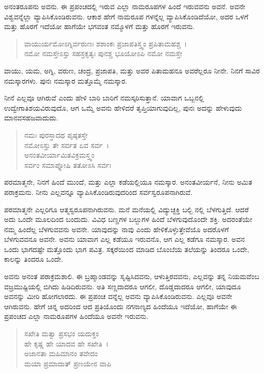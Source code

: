 ಅನಂತರೂಪನು ಅವನು. ಈ ಪ್ರಪಂಚದಲ್ಲಿ ಇರುವ ಎಲ್ಲಾ ನಾಮರೂಪಗಳ ಹಿಂದೆ ಇರುವವನು ಅವನೆ. ಅವನೇ ವಿಶ್ವವನ್ನೆಲ್ಲಾ ವ್ಯಾಪಿಸಿಕೊಂಡಿರುವನು. ಆಕಾಶ ಹೇಗೆ ನಾಮರೂಪ ಗಳನ್ನೆಲ್ಲ ವ್ಯಾಪಿಸಿಕೊಂಡಿದೆಯೋ, ಅದರ ಒಳಗೆ ಮತ್ತು ಹೊರಗೆ ಇದೆಯೋ ಹಾಗೆಯೇ ಭಗವಂತ ನಮ್ಮೊಳಗೆ ಮತ್ತು ಹೊರಗೆ ಇರುವನು.

\begin{verse}
ವಾಯುರ್ಯಮೋಽಗ್ನಿರ್ವರುಣಃ ಶಶಾಂಕಃ ಪ್ರಜಾಪತಿಸ್ತ್ವಂ ಪ್ರಪಿತಾಮಹಶ್ಚ~।\\ನಮೋ ನಮಸ್ತೇಽಸ್ತು ಸಹಸ್ರಕೃತ್ವಃ ಪುನಶ್ಚ ಭೂಯೋಽಪಿ ನಮೋ ನಮಸ್ತೇ 
\end{verse}

{\small ವಾಯು, ಯಮ, ಅಗ್ನಿ, ವರುಣ, ಚಂದ್ರ, ಪ್ರಜಾಪತಿ, ಮತ್ತು ಅವರ ಪಿತಾಮಹನೂ ಅವರೆಲ್ಲರೂ ನೀನೇ. ನಿನಗೆ ಸಾವಿರ ನಮಸ್ಕಾರಗಳು. ಪುನಃ ನಮಸ್ಕಾರ ಮತ್ತೊಮ್ಮೆ ನಮಸ್ಕಾರ.}

ನೀನೆ ಎಲ್ಲವೂ ಆಗಿರುವೆ ಎಂದು ಹೇಳಿ ಬಾರಿ ಬಾರಿಗೆ ನಮಸ್ಕರಿಸುತ್ತಾನೆ. ಯಾವಾಗ ಒಬ್ಬನಲ್ಲಿ ಉದ್ವೇಗಾತಿಶಯವಿರುವುದೊ, ಆಗ ಒಮ್ಮೆ ಅವನು ಹೇಳಿದರೆ ತೃಪ್ತಿಯಾಗುವುದಿಲ್ಲ, ಪುನಃ ಅದನ್ನು ಹೇಳುವುದು ಮಾನವಸಹಜವಾದುದು.

\begin{verse}
ನಮಃ ಪುರಸ್ತಾದಥ ಪೃಷ್ಠತಸ್ತೇ \\ ನಮೋಽಸ್ತು ತೇ ಸರ್ವತ ಏವ ಸರ್ವ~।\\ ಅನಂತವೀರ್ಯಾಮಿತವಿಕ್ರಮಸ್ತ್ವಂ \\ ಸರ್ವಂ ಸಮಾಪ್ನೋಷಿ ತತೋಽಸಿ ಸರ್ವಃ 
\end{verse}

{\small ಪರಮಾತ್ಮನೇ, ನಿನಗೆ ಹಿಂದೆ ಮುಂದೆ, ಮತ್ತು ಎಲ್ಲಾ ಕಡೆಯಲ್ಲಿಯೂ ನಮಸ್ಕಾರ. ಅನಂತವೀರ್ಯನೆ, ನೀನು ಅಮಿತ ಪರಾಕ್ರಮನು. ನೀನು ಎಲ್ಲವನ್ನೂ ವ್ಯಾಪಿಸಿಕೊಂಡಿರುವುದರಿಂದ ಸರ್ವಸ್ವರೂಪನಾಗಿರುವೆ.}

ಪರಮಾತ್ಮನೇ ಎಲ್ಲರಿಗೂ ಆತ್ಮಸ್ವರೂಪನಾಗಿರುವನು. ಮನೆ ಮನೆಯಲ್ಲಿ ವಿದ್ಯುಚ್ಛಕ್ತಿ ಬಲ್ಬಿ ನಲ್ಲಿ ಬೆಳಗುತ್ತಿದೆ. ಆದರೆ ಅದು ಒಂದೇ ಮೂಲದಿಂದ ಬಂದುದು. ವಿವಿಧ ಬಣ್ಣಗಳ ಬಲ್ಬುಗಳ ಹಿಂದೆ ಬೆಳಗುವುದೊಂದೇ ಶಕ್ತಿ. ಅದರಂತೆಯೇ ನಮ್ಮ ಹಿಂದೆಲ್ಲ ಬೆಳಗುವವನು ಅವನೇ. ಯಾವುದನ್ನು ನಾವು ಎಂದು ಹೇಳಿಕೊಳ್ಳುತ್ತೇವೆಯೊ ಅದರೊಳಗೆ ಬೆಳಗುವವನೂ ಅವನೇ. ಅವನು ಯಾವಾಗ ಎಲ್ಲ ಕಡೆಯೂ ಇರುವನೊ, ಆಗ ಎಲ್ಲ ಕಡೆಗೂ ನಮಸ್ಕಾರ. ಅವನ ಒಂದು ಭಾಗದಷ್ಟೇ ಮತ್ತೊಂದು ಭಾಗ ಪವಿತ್ರ. ಸಕ್ಕರೆಯಿಂದ ಮಾಡಿದ ಬೊಂಬೆಯ ತಲೆಯನ್ನು ತಿಂದರೂ ಒಂದೇ, ಕಾಲನ್ನು ತಿಂದರೂ ಒಂದೇ.

ಅವನು ಅನಂತ ಪರಾಕ್ರಮಶಾಲಿ. ಈ ಬ್ರಹ್ಮಾಂಡವನ್ನು ಸೃಷ್ಟಿಸಿದವನು, ಆಳುತ್ತಿರವವನು, ಎಲ್ಲವನ್ನು ತನ್ನ ನಿಯಮವೆಂಬ ವಜ್ರಮುಷ್ಟಿಯಲ್ಲಿ ಬಿಗಿದು ಹಿಡಿದಿರುವನು. ಅತಿ ಸಣ್ಣದಾದರೂ ಆಗಲೀ, ದೊಡ್ಡದಾದರೂ ಆಗಲೀ, ಯಾವುದೂ ಅವನನ್ನು ಮೀರಿ ಹೋಗಲಾರದು. ಈ ಪ್ರಪಂಚ ವನ್ನೆಲ್ಲ ಅವನು ವ್ಯಾಪಿಸಿಕೊಂಡಿರುವನು. ಎಲ್ಲವೂ ಅವನೇ ಆಗಿರುವನು. ಹೇಗೆ ಚಿನ್ನ ಅದರಿಂದ ಆದ ಪ್ರತಿಯೊಂದು ನಗನಾಣ್ಯದ ಹಿಂದೆಯೂ ಇದೆಯೋ, ಹಾಗೆಯೇ ಈ ಪ್ರಪಂಚದ ಎಲ್ಲಾ ನಾಮರೂಪಗಳ ಹಿಂದೆಯೂ ಅವನೇ ಇರುವನು.

\begin{verse}
ಸಖೇತಿ ಮತ್ವಾ ಪ್ರಸಭಂ ಯದುಕ್ತಂ \\ ಹೇ ಕೃಷ್ಣ ಹೇ ಯಾದವ ಹೇ ಸಖೇತಿ~।\\ಅಜಾನತಾ ಮಹಿಮಾನಂ ತವೇದಂ \\ ಮಯಾ ಪ್ರಮಾದಾತ್ ಪ್ರಣಯೇನ ವಾಪಿ 
\end{verse}

